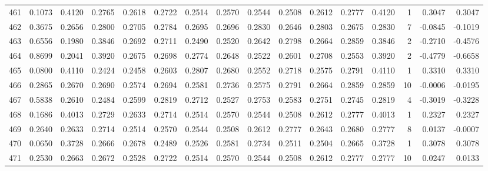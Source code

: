 \begin{tabular}{lrrrrrrrrrrrrrrr}
461 &      0.1073 &  0.4120 &  0.2765 &  0.2618 &  0.2722 &  0.2514 &  0.2570 &  0.2544 &  0.2508 &  0.2612 &   0.2777 &     0.4120 &      1 &                    0.3047 &                     0.3047 \\
462 &      0.3675 &  0.2656 &  0.2800 &  0.2705 &  0.2784 &  0.2695 &  0.2696 &  0.2830 &  0.2646 &  0.2803 &   0.2675 &     0.2830 &      7 &                   -0.0845 &                    -0.1019 \\
463 &      0.6556 &  0.1980 &  0.3846 &  0.2692 &  0.2711 &  0.2490 &  0.2520 &  0.2642 &  0.2798 &  0.2664 &   0.2859 &     0.3846 &      2 &                   -0.2710 &                    -0.4576 \\
464 &      0.8699 &  0.2041 &  0.3920 &  0.2675 &  0.2698 &  0.2774 &  0.2648 &  0.2522 &  0.2601 &  0.2708 &   0.2553 &     0.3920 &      2 &                   -0.4779 &                    -0.6658 \\
465 &      0.0800 &  0.4110 &  0.2424 &  0.2458 &  0.2603 &  0.2807 &  0.2680 &  0.2552 &  0.2718 &  0.2575 &   0.2791 &     0.4110 &      1 &                    0.3310 &                     0.3310 \\
466 &      0.2865 &  0.2670 &  0.2690 &  0.2574 &  0.2694 &  0.2581 &  0.2736 &  0.2575 &  0.2791 &  0.2664 &   0.2859 &     0.2859 &     10 &                   -0.0006 &                    -0.0195 \\
467 &      0.5838 &  0.2610 &  0.2484 &  0.2599 &  0.2819 &  0.2712 &  0.2527 &  0.2753 &  0.2583 &  0.2751 &   0.2745 &     0.2819 &      4 &                   -0.3019 &                    -0.3228 \\
468 &      0.1686 &  0.4013 &  0.2729 &  0.2633 &  0.2714 &  0.2514 &  0.2570 &  0.2544 &  0.2508 &  0.2612 &   0.2777 &     0.4013 &      1 &                    0.2327 &                     0.2327 \\
469 &      0.2640 &  0.2633 &  0.2714 &  0.2514 &  0.2570 &  0.2544 &  0.2508 &  0.2612 &  0.2777 &  0.2643 &   0.2680 &     0.2777 &      8 &                    0.0137 &                    -0.0007 \\
470 &      0.0650 &  0.3728 &  0.2666 &  0.2678 &  0.2489 &  0.2526 &  0.2581 &  0.2734 &  0.2511 &  0.2504 &   0.2665 &     0.3728 &      1 &                    0.3078 &                     0.3078 \\
471 &      0.2530 &  0.2663 &  0.2672 &  0.2528 &  0.2722 &  0.2514 &  0.2570 &  0.2544 &  0.2508 &  0.2612 &   0.2777 &     0.2777 &     10 &                    0.0247 &                     0.0133 \\

\end{tabular}
